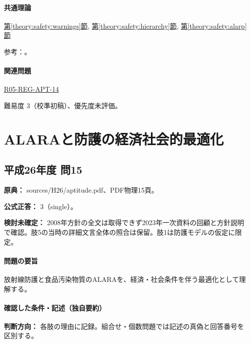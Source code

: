 \paragraph{共通理論} \hyperref[theory:safety:warnings]{第\ref*{theory:safety:warnings}節}, \hyperref[theory:safety:hierarchy]{第\ref*{theory:safety:hierarchy}節}, \hyperref[theory:safety:alarp]{第\ref*{theory:safety:alarp}節}

\par 参考：\cite{saf_ra2006,saf_guide51,saf_parliament2006}。

\paragraph{関連問題} \hyperref[q:r05-reg-apt-14]{R05-REG-APT-14}

\par 難易度 3（校準初稿）、優先度未評価。

\section{ALARAと防護の経済社会的最適化}

\subsection{平成26年度 問15}
\label{q:h26-reg-apt-15}

\noindent\textbf{原典：} sources/H26/aptitude.pdf、PDF物理15頁。

\textbf{公式正答：} 3（single）。

\par\textbf{検討未確定：} 2008年方針の全文は取得できず2023年一次資料の回顧と方針説明で確認。肢5の当時の詳細文言全体の照合は保留。肢1は防護モデルの仮定に限定。

\paragraph{問題の要旨} 放射線防護と食品汚染物質のALARAを、経済・社会条件を伴う最適化として理解する。

\paragraph{確認した条件・記述（独自要約）}\mbox{}\par

\noindent\textbf{判断方向：} 各肢の理由に記録。組合せ・個数問題では記述の真偽と回答番号を区別する。\par

